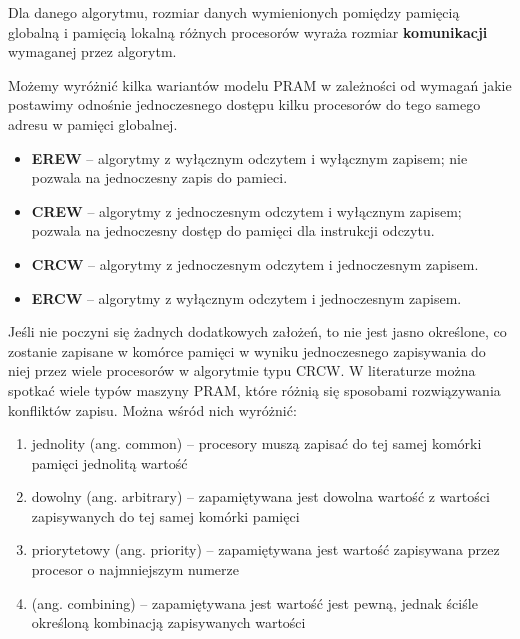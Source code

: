 Dla danego algorytmu, rozmiar danych wymienionych pomiędzy pamięcią globalną i pamięcią lokalną różnych procesorów wyraża rozmiar \textbf{komunikacji} wymaganej przez algorytm.


Możemy wyróżnić kilka wariantów modelu PRAM w zależności od wymagań jakie postawimy odnośnie jednoczesnego dostępu kilku procesorów do tego samego adresu w pamięci globalnej.\\
\begin{itemize}
\item\textbf{EREW} -- algorytmy z wyłącznym odczytem i wyłącznym zapisem; nie pozwala na jednoczesny zapis do pamieci.
\item\textbf{CREW} -- algorytmy z jednoczesnym odczytem i wyłącznym zapisem; pozwala na jednoczesny  dostęp do pamięci dla instrukcji odczytu.
\item\textbf{CRCW} -- algorytmy z jednoczesnym odczytem i jednoczesnym zapisem.
\item\textbf{ERCW} -- algorytmy z wyłącznym odczytem i jednoczesnym zapisem.
\end{itemize}


Jeśli nie poczyni się żadnych dodatkowych założeń, to nie jest jasno określone, co zostanie zapisane w komórce pamięci w wyniku jednoczesnego zapisywania do niej przez wiele procesorów w algorytmie typu CRCW. W literaturze można spotkać wiele typów maszyny PRAM, które różnią się sposobami rozwiązywania konfliktów zapisu. Można wśród nich wyróżnić\cite{Cormen94}:
\begin{enumerate}
\item jednolity (ang. common) – procesory muszą zapisać do tej samej komórki pamięci jednolitą wartość
\item dowolny (ang. arbitrary) – zapamiętywana jest dowolna wartość z wartości zapisywanych do tej samej komórki pamięci
\item priorytetowy (ang. priority) – zapamiętywana jest wartość zapisywana przez procesor o najmniejszym numerze
\item (ang. combining) – zapamiętywana jest wartość jest pewną, jednak ściśle określoną kombinacją zapisywanych wartości
\end{enumerate}

